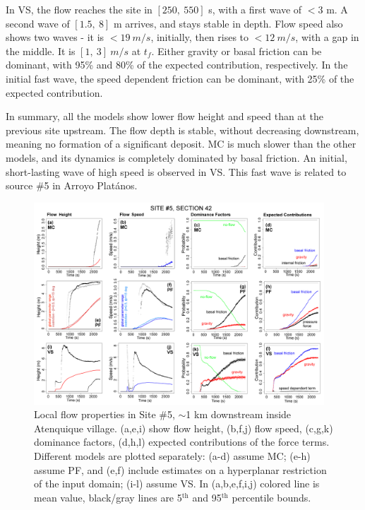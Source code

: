\documentclass[nhess, manuscript]{copernicus}
\begin{document}
In VS, the flow reaches the site in $[250,\ 550]$ s, with a first wave of $<3$ m. A second wave of $[1.5,\ 8]$ m arrives, and stays stable in depth. Flow speed also shows two waves - it is $<19\ m/s$, initially, then rises to $<12\ m/s$, with a gap in the middle. It is $[1,\ 3]\ m/s$ at $t_f$. Either gravity or basal friction can be dominant, with 95\% and 80\% of the expected contribution, respectively. In the initial fast wave, the speed dependent friction can be dominant, with 25\% of the expected contribution.

In summary, all the models show lower flow height and speed than at the previous site upstream. The flow depth is stable, without decreasing downstream, meaning no formation of a significant deposit. MC is much slower than the other models, and its dynamics is completely dominated by basal friction. An initial, short-lasting wave of high speed is observed in VS. This fast wave is related to source \#5 in Arroyo Plat\'anos.
\begin{figure}[H]
\centering
\includegraphics[width=0.97\textwidth]{Fig7.png}
\caption{Local flow properties in Site \#5, $\sim$1 km downstream inside Atenquique village. (a,e,i) show flow height, (b,f,j) flow speed, (c,g,k) dominance factors, (d,h,l) expected contributions of the force terms. Different models are plotted separately: (a-d) assume MC; (e-h) assume PF, and (e,f) include estimates on a hyperplanar restriction of the input domain; (i-l) assume VS. In (a,b,e,f,i,j) colored line is mean value, black/gray lines are 5$^{\mathrm{th}}$ and 95$^{\mathrm{th}}$ percentile bounds.}
\label{Fig7}
\end{figure}
\end{document}
